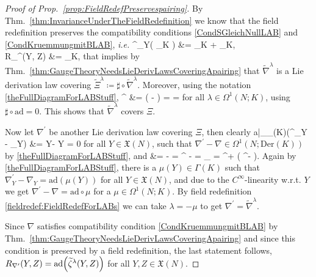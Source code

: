 \begin{proof}[Proof of Prop.~\ref{prop:FieldRedefPreservespairing}]
\leavevmode\newline
By Thm.~\ref{thm:InvarianceUnderTheFieldRedefinition} we know that the field redefinition preserves the compatibility conditions \eqref{CondSGleichNullLAB} and \eqref{CondKruemmungmitBLAB}, \textit{i.e.}
\bas
\widetilde{\nabla}^\lambda_Y\mleft( \mleft[ \mu, \nu \mright]_K \mright)
&=
_K
	+ _K, \\
R_{\widetilde{\nabla}^\lambda}(Y, Z) \mu
&=
_K,
\eas
that implies by Thm.~\ref{thm:GaugeTheoryNeedsLieDerivLawsCoveringApairing} that $\widetilde{\nabla}^\lambda$ is a Lie derivation law covering $\widetilde{\Xi}^\lambda \coloneqq \sharp \circ \widetilde{\nabla}^\lambda$. Moreover, using the notation \eqref{theFullDiagramForLABStuff},
\bas
\sharp \circ \widetilde{\nabla}^\lambda
&=
\sharp \circ \mleft( \nabla -  \circ \lambda \mright)
=
\sharp \circ \nabla
=
\Xi
\eas
for all $\lambda \in \Omega^1(N; K)$, using $\sharp \circ \mathrm{ad} = 0$. This shows that $\widetilde{\nabla}^\lambda$ covers $\Xi$.

Now let $\nabla^\prime$ be another Lie derivation law covering $\Xi$, then clearly
\bas
a|_{_{}(K)}(\nabla^\prime_Y - \nabla_Y)
&= Y- Y = 0
\eas
for all $Y \in \mathfrak{X}(N)$, such that $\nabla^\prime - \nabla \in \Omega^1(N; \mathrm{Der}(K))$ by \eqref{theFullDiagramForLABStuff}, and
&=
\Xi - \Xi
=
\sharp \circ \nabla^\prime
	- \sharp \circ \nabla
=
\sharp \circ \underbrace{\mleft( \nabla^\prime - \nabla \mright)}_{}
=
\sharp^+ \circ \mleft( \nabla^\prime - \nabla \mright).
\eas
Again by \eqref{theFullDiagramForLABStuff}, there is a $\mu(Y) \in \Gamma(K)$ such that $\nabla^\prime_Y - \nabla_Y = \mathrm{ad}(\mu(Y))$ for all $Y \in \mathfrak{X}(N)$, and due to the $C^\infty$-linearity w.r.t. $Y$ we get $\nabla^\prime - \nabla = \mathrm{ad} \circ \mu$ for a $\mu \in \Omega^1(N; K)$. By field redefinition \ref{fieldredef:FieldRedefForLABs} we can take $\lambda = - \mu$ to get $\nabla^\prime = \widetilde{\nabla}^\lambda$.

Since $\nabla$ satisfies compatibility condition \eqref{CondKruemmungmitBLAB} by Thm.~\ref{thm:GaugeTheoryNeedsLieDerivLawsCoveringApairing} and since this condition is preserved by a field redefinition, the last statement follows, $R_{\nabla^\prime}(Y, Z) = \mathrm{ad}\mleft( \widetilde{\zeta}^\lambda(Y, Z) \mright)$ for all $Y, Z \in \mathfrak{X}(N)$.
\end{proof}

